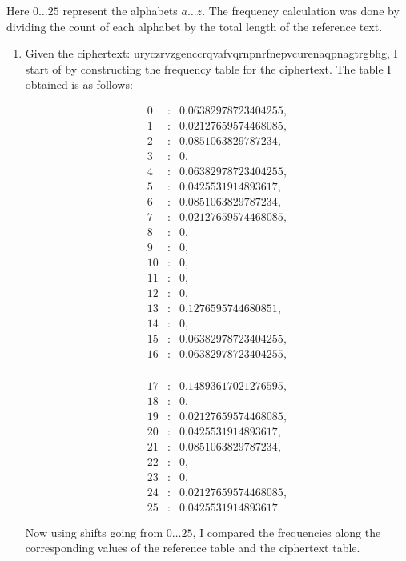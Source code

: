 \documentclass{ashoka-crypto}
\begin{document}
Here $0 \dots 25$ represent the alphabets $a \dots z$. The frequency calculation was done by dividing the count of each alphabet by the total length of the reference text. 

\begin{enumerate}[label=(\alph*)]
\item Given the ciphertext: uryczrvzgenccrqvafvqrnpnrfnepvcurenaqpnagtrgbhg, I start of by constructing the frequency table for the ciphertext. The table I obtained is as follows:

\[
\begin{array}{rcl}
0 & : & 0.06382978723404255, \\
1 & : & 0.02127659574468085, \\
2 & : & 0.0851063829787234, \\
3 & : & 0, \\
4 & : & 0.06382978723404255, \\
5 & : & 0.0425531914893617, \\
6 & : & 0.0851063829787234, \\
7 & : & 0.02127659574468085, \\
8 & : & 0, \\
9 & : & 0, \\
10 & : & 0, \\
11 & : & 0, \\
12 & : & 0, \\
13 & : & 0.1276595744680851, \\
14 & : & 0, \\
15 & : & 0.06382978723404255, \\
16 & : & 0.06382978723404255, \\
\end{array}
\]

\[
\begin{array}{rcl}
17 & : & 0.14893617021276595, \\
18 & : & 0, \\
19 & : & 0.02127659574468085, \\
20 & : & 0.0425531914893617, \\
21 & : & 0.0851063829787234, \\
22 & : & 0, \\
23 & : & 0, \\
24 & : & 0.02127659574468085, \\
25 & : & 0.0425531914893617
\end{array}
\]

 
Now using shifts going from $0\dots 25$, I compared the frequencies along the corresponding values of the reference table and the ciphertext table. 


\end{enumerate}
\end{document}
